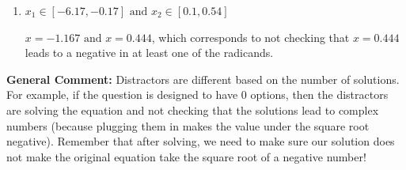 \documentclass{extbook}[14pt]
\begin{document}
\begin{enumerate}
{\begin{enumerate}[label=\Alph*.]
This corresponds to believing both $x = -1.167 \text{ and } x = 0.444$ both lead to complex values.
\item \( x_1 \in [-6.17, -0.17] \text{ and } x_2 \in [0.1,0.54] \)

$x = -1.167 \text{ and } x = 0.444$, which corresponds to not checking that $x = 0.444$ leads to a negative in at least one of the radicands.
\end{enumerate}

\textbf{General Comment:} Distractors are different based on the number of solutions. For example, if the question is designed to have 0 options, then the distractors are solving the equation and not checking that the solutions lead to complex numbers (because plugging them in makes the value under the square root negative). Remember that after solving, we need to make sure our solution does not make the original equation take the square root of a negative number!
}
\end{enumerate}
\end{document}

